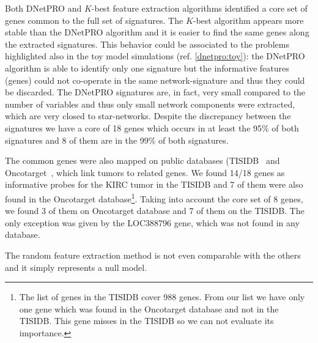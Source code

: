 \documentclass{standalone}
\begin{document}
Both \textsf{DNetPRO} and $K$-best feature extraction algorithms identified a core set of genes common to the full set of signatures.
The $K$-best algorithm appears more stable than the \textsf{DNetPRO} algorithm and it is easier to find the same genes along the extracted signatures.
This behavior could be associated to the problems highlighted also in the toy model simulations (ref. \ref{dnetpro:toy}): the \textsf{DNetPRO} algorithm is able to identify only one signature but the informative features (genes) could not co-operate in the same network-signature and thus they could be discarded.
The \textsf{DNetPRO} signatures are, in fact, very small compared to the number of variables and thus only small network components were extracted, which are very closed to star-networks.
Despite the discrepancy between the signatures we have a core of 18 genes which occurs in at least the 95\% of both signatures and 8 of them are in the 99\% of both signatures.

The common genes were also mapped on public databases (TISIDB~\cite{10.1093/bioinformatics/btz210} and Oncotarget~\cite{OT9487}, which link tumors to related genes.
We found 14/18 genes as informative probes for the KIRC tumor in the TISIDB and 7 of them were also found in the Oncotarget database\footnote{
  The list of genes in the TISIDB cover  988 genes.
  From our list we have only one gene which was found in the Oncotarget database and not in the TISIDB.
  This gene misses in the TISIDB so we can not evaluate its importance.
}.
Taking into account the core set of 8 genes, we found 3 of them on Oncotarget database and 7 of them on the TISIDB.
The only exception was given by the LOC388796 gene, which was not found in any database.

The random feature extraction method is not even comparable with the others and it simply represents a null model.
\end{document}
